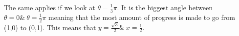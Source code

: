 \documentclass[preview]{standalone}
\begin{document}
\begin{center}
The same applies if we look at $\theta = \frac{1}{3} \pi$. It is the biggest angle between $\theta = 0 \& \ \theta = \frac{1}{2} \pi$ meaning that the most amount of progress is made to go from (1,0) to (0,1). This means that $y = \frac{\sqrt{3}}{2} \& \ x = \frac{1}{2}$.
\end{center}
\end{document}
